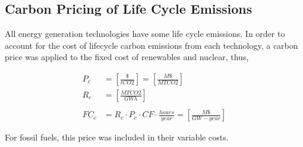 \subsection{Carbon Pricing of Life Cycle Emissions}
All energy generation technologies have some life cycle emissions.
In order to account for the cost of lifecycle carbon emissions from each 
technology, a carbon price was applied to the fixed cost of renewables and 
nuclear, thus,

\begin{align}
P_c &= \left[\frac{\$}{tCO2}\right] = \left[\frac{M\$}{MTCO2}\right]\\
R_c &= \left[\frac{MTCO2}{GWh}\right]\\\\
FC_c &= R_c\cdot P_c \cdot CF \cdot \frac{hours}{year} = \left[\frac{M\$}{GW-year}\right]
\end{align}

For fossil fuels, this price was included in their variable costs.

